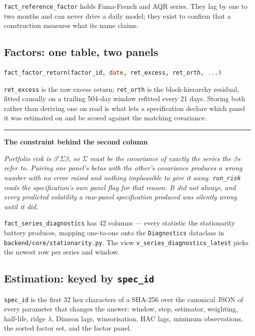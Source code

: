 \documentclass[11pt,a4paper]{article}
\newcommand{\code}[1]{\texttt{\small #1}}
\newenvironment{designnote}[1]
  {\par\vspace{1.6ex}%
   \begin{lrbox}{\notebox}\begin{minipage}{\textwidth}%
   {\color{rule}\rule{\textwidth}{0.4pt}}\par\vspace{0.7ex}
   {\small\sffamily\bfseries\color{navy}#1}\par\vspace{0.35ex}
   \small\itshape}
  {\par\vspace{0.7ex}\noindent{\color{rule}\rule{\textwidth}{0.4pt}}%
   \end{minipage}\end{lrbox}%
   \noindent\usebox{\notebox}\par\vspace{1.6ex}}
\begin{document}
\code{fact\_reference\_factor} holds Fama-French and AQR series. They lag by one to
two months and can never drive a daily model; they exist to confirm that a
construction measures what its name claims.

\subsection{Factors: one table, two panels}

\begin{lstlisting}[language=SQL]
fact_factor_return(factor_id, date, ret_excess, ret_orth, ...)
\end{lstlisting}

\code{ret\_excess} is the raw excess return; \code{ret\_orth} is the
block-hierarchy residual, fitted causally on a trailing 504-day window refitted
every 21 days. Storing both rather than deriving one on read is what lets a
specification declare which panel it was estimated on and be scored against the
matching covariance.

\begin{designnote}{The constraint behind the second column}
Portfolio risk is $\beta'\Sigma\beta$, so $\Sigma$ must be the covariance of
exactly the series the $\beta$s refer to. Pairing one panel's betas with the
other's covariance produces a wrong number with no error raised and nothing
implausible to give it away. \code{run\_risk} reads the specification's own panel
flag for that reason. It did not always, and every predicted volatility a
raw-panel specification produced was silently wrong until it did.
\end{designnote}

\code{fact\_series\_diagnostics} has 42 columns --- every statistic the stationarity
battery produces, mapping one-to-one onto the \code{Diagnostics} dataclass in
\code{backend/core/stationarity.py}. The view
\code{v\_series\_diagnostics\_latest} picks the newest row per series and window.

\subsection{Estimation: keyed by \code{spec\_id}}

\code{spec\_id} is the first 32 hex characters of a SHA-256 over the canonical JSON
of every parameter that changes the answer: window, step, estimator, weighting,
half-life, ridge $\lambda$, Dimson lags, winsorisation, HAC lags, minimum
observations, the sorted factor set, and the factor panel.
\end{document}
